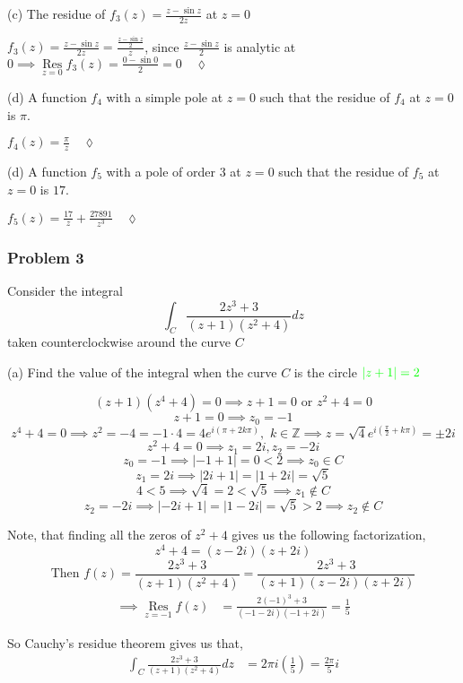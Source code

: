 \documentclass{article}
\newcommand\Z{\mathbb{Z}}
\def\res{\mathop{\text{Res}}\limits}
\begin{document}
(c) The residue of $f_3 (z) = \frac{z−\sin z }{2z}$ at $z = 0$

 $f_3(z) = \frac{z-\sin z}{2z} = \frac{\frac{z-\sin
    z}{2}}{z}$, since $\frac{z-\sin z}{2}$ is analytic at $0\implies
\res_{z=0}f_3(z) = \frac{0-\sin 0}{2}= 0\quad \lozenge$

(d) A function $f_4$ with a simple pole at $z = 0$ such that the
residue of $f_4$ at $z = 0 $ is $ π$.

 $f_4(z) = \frac{\pi}{z}\quad \lozenge$

(d) A function $f_5$ with a pole  of order $3$ at $z = 0$ such that the
residue of $f_5$ at $z = 0 $ is $17$.

 $f_5(z) = \frac{17}{z} +\frac{27891}{z^3}\quad \lozenge$
\newpage

\newpage
\subsubsection*{Problem 3} Consider the integral \[\int_C
  \frac{2z^3+3}{(z+1)(z^2 +4)} dz\] taken counterclockwise around the
curve $C$

(a) Find the value of the integral when the curve $C$ is the circle
${\color{green}|z + 1| = 2}$


\[(z+1)(z^4+4) = 0\implies z+1 = 0 \text{ or } z^2+4 = 0\]
\[z+1 = 0 \implies z_0 = -1\]
\[z^4+4 = 0 \implies z^2 = -4 = -1\cdot 4 = 4 e^{i\left(  \pi+
      2k\pi\right)},\,\, k\in \Z \implies z =
  \sqrt{4}e^{i\left(  \frac{\pi}{2}+ k\pi \right)}= \pm 2i\]
\[z^2+4 = 0 \implies z_1 = 2i,z_2 = -2i\]
\[z_0 = -1 \implies |-1+1| = 0 <2 \implies z_0\in C\]
\[z_1 = 2i \implies |2i+1| = |1+2i| = \sqrt{5}\]\[ 4<5 \implies
  \sqrt{4} = 2< \sqrt{5}  \implies z_1\not\in C\]
\[z_2 = -2i \implies |-2i+1| = |1-2i| = \sqrt{5} > 2\implies z_2 \not\in C\]

Note, that finding all the zeros of $z^2+4$ gives us the following factorization,
\[z^4+4 = (z-2i)(z+2i) \]
\[\text{Then } f(z) = \frac{2z^3+3}{(z+1)(z^2 +4)} = \frac{2z^3+3}{(z+1)(z-2i)(z+2i)}\]
\begin{align*}\implies \res_{z=-1} f(z) &=
  \frac{2(-1)^3+3}{(-1 -2i)(-1+2i)}= \frac{1}{5}
  \end{align*}

So Cauchy's residue theorem gives us that,
 \begin{align*}\int_C
  \frac{2z^3+3}{(z+1)(z^2 +4)} dz &= 2\pi i\left( \frac{1}{5}
                                    \right) = \frac{2\pi }{5}i\end{align*}
\end{document}
